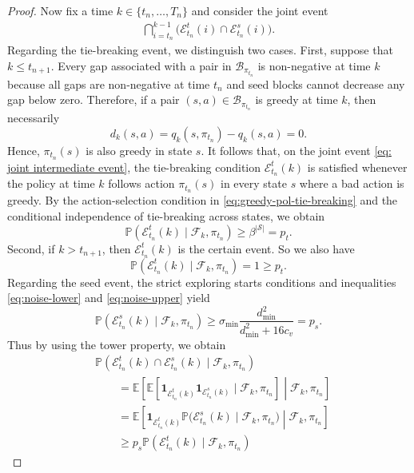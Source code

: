 \begin{proof}
Now fix a time $k \in \{t_n, \dots, T_n\}$ and consider the joint event
\begin{align}
\label{eq: joint intermediate event}
\bigcap_{i=t_n}^{k-1} \bigl( \mathcal E^t_{t_n}(i)\cap \mathcal E^s_{t_n}(i) \bigr).
\end{align}
Regarding the tie-breaking event, we distinguish two cases.
First, suppose that $k \le t_{n+1}$. 
Every gap associated with a pair in \(\mathcal B_{\pi_{t_n}}\) is non-negative at time \(k\) because all gaps are non-negative at time \(t_n\) and seed blocks cannot decrease any gap below zero.
Therefore, if a pair \((s,a)\in\mathcal B_{\pi_{t_n}}\) is greedy at time \(k\), then necessarily
\[
d_k(s,a)=q_k(s,\pi_{t_n})-q_k(s,a)=0.
\]
Hence, \(\pi_{t_n}(s)\) is also greedy in state \(s\). It follows that, on the joint event \eqref{eq: joint intermediate event}, the tie-breaking condition \(\mathcal E^t_{t_n}(k)\) is satisfied whenever the policy at time \(k\) follows action \(\pi_{t_n}(s)\) in every state \(s\) where a bad action is greedy. By the action-selection condition in \eqref{eq:greedy-pol-tie-breaking} and the conditional independence of tie-breaking across states, we obtain
\[
\mathbb P\!\left(\mathcal E^t_{t_n}(k)\mid \mathcal F_k,\pi_{t_n}\right)
\ge
\beta^{|\mathcal S|}
=
p_t .
\]
Second, if \(k>t_{n+1}\), then $\mathcal E^t_{t_n}(k)$ is the certain event. So we also have
\[
\mathbb P\!\left(\mathcal E^t_{t_n}(k)\mid \mathcal F_k,\pi_{t_n}\right)=1\ge p_t .
\]
Regarding the seed event, the strict exploring starts conditions and inequalities \eqref{eq:noise-lower} and \eqref{eq:noise-upper} yield
\[
\mathbb P\!\left(\mathcal E^s_{t_n}(k)\mid \mathcal F_{k}, \pi_{t_n} \right)
\ge
\sigma_{\min}\frac{d_{\min}^2}{d_{\min}^2+16c_v}
=
p_s .
\]
Thus by using the tower property, we obtain
\begin{align*}
&\mathbb P\!\left(\mathcal E^t_{t_n}(k)\cap \mathcal E^s_{t_n}(k)\mid \mathcal F_{k}, \pi_{t_n }\right)
\\
&\qquad =
\mathbb E\!\left[ \mathbb E\!\left[ \mathbf 1_{\mathcal E^t_{t_n}(k)} \mathbf 1_{\mathcal E^s_{t_n}(k)} \mid \mathcal F_{k}, \pi_{t_n} \right] \middle| \mathcal F_k, \pi_{t_n}\right]
\\
&\qquad =
\mathbb E\!\left[ \mathbf 1_{\mathcal E^t_{t_n}(k)} \mathbb P \big( \mathcal E^s_{t_n}(k) \mid \mathcal F_{k}, \pi_{t_n} \big) \middle| \mathcal F_k, \pi_{t_n}\right]
\\
&\qquad \ge
p_s
\mathbb P\!\left(\mathcal E^t_{t_n}(k) \mid \mathcal F_{k}, \pi_{t_n} \right)

\end{align*}
\end{proof}
